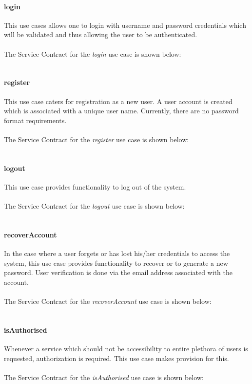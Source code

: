 \documentclass[11pt,a4paper,titlepage]{article}
\begin{document}
		\paragraph{login }
		This use cases allows one to login with username and password credentials which will be validated and thus allowing the user to be authenticated.\\\hfill\\
		The Service Contract for the \textit{login} use case is shown below:\\\hfill\\
		\paragraph{register }
		This use case caters for registration as a new user. A user account is created which is associated with a unique user name. Currently, there are no password format requirements.\\\hfill\\
		The Service Contract for the \textit{register} use case is shown below:\\\hfill\\
		\paragraph{logout }
		This use case provides functionality to log out of the system.\\\hfill\\
		The Service Contract for the \textit{logout} use case is shown below:\\\hfill\\
		\paragraph{recoverAccount }
		In the case where a user forgets or has lost his/her credentials to access the system, this use case provides functionality to recover or to generate a new password. User verification is done via the email address associated with the account.\\\hfill\\ 
		The Service Contract for the \textit{recoverAccount} use case is shown below:\\\hfill\\
		\paragraph{isAuthorised }
		Whenever a service which should not be accessibility to entire plethora of users is requested, authorization is required. This use case makes provision for this.\\\hfill\\
		The Service Contract for the \textit{isAuthorised} use case is shown below:\\\hfill\\
\end{document}
